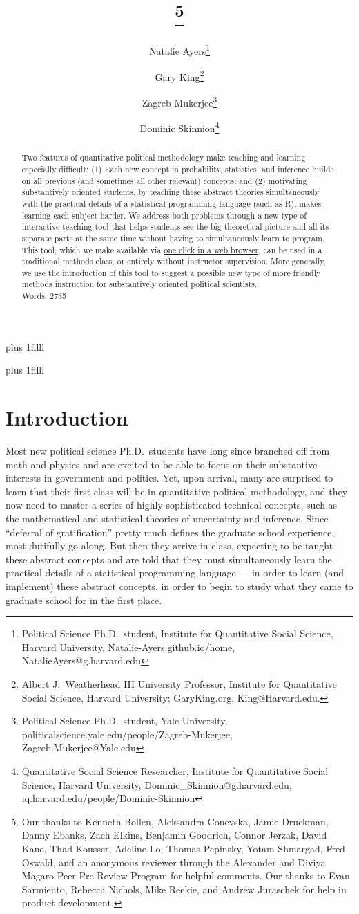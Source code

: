 \documentclass[12pt]{article}
\title{\titl}
\title{\titl\thanks{Our thanks to Kenneth Bollen, Aleksandra Conevska, Jamie Druckman, Danny Ebanks, Zach Elkins, Benjamin Goodrich, Connor Jerzak, David Kane, Thad Kousser, Adeline Lo, Thomas Pepinsky, Yotam Shmargad, Fred Oswald, and an anonymous reviewer through the Alexander and Diviya Magaro Peer Pre-Review Program for helpful comments. Our thanks to Evan Sarmiento, Rebecca Nichols, Mike Reekie, and Andrew Juraschek for help in product development.}}
\author{Natalie Ayers\thanks{Political Science Ph.D.\ student, Institute for Quantitative Social Science, Harvard University, Natalie-Ayers.github.io/home, NatalieAyers@g.harvard.edu}\and Gary King\thanks{Albert J.\ Weatherhead
III University Professor, Institute for Quantitative Social
Science, Harvard University; GaryKing.org, King@Harvard.edu.}\and Zagreb Mukerjee\thanks{Political Science Ph.D.\ student, Yale University, politicalscience.yale.edu/people/Zagreb-Mukerjee, Zagreb.Mukerjee@Yale.edu} \and Dominic Skinnion\thanks{Quantitative Social Science Researcher, Institute for Quantitative Social Science, Harvard University, Dominic\_Skinnion@g.harvard.edu, iq.harvard.edu/people/Dominic-Skinnion}}
\newcommand{\btVFill}{\vskip0pt plus 1filll}
\theoremstyle{definition}
\begin{document}
\maketitle\thispagestyle{empty}\setcounter{page}{0}
\btVFill
\vspace{-2\baselineskip}
\begin{abstract}
  \noindent Two features of quantitative political methodology make teaching and learning especially difficult: (1) Each new concept in probability, statistics, and inference builds on all previous (and sometimes all other relevant) concepts; and (2) motivating substantively oriented students, by teaching these abstract theories simultaneously with the practical details of a statistical programming language (such as R), makes learning each subject harder. We address both problems through a new type of interactive teaching tool that helps students see the big theoretical picture and all its separate parts at the same time without having to simultaneously learn to program. This tool, which we make available via \href{https://2k1.iq.harvard.edu}{one click in a web browser}, can be used in a traditional methods class, or entirely without instructor supervision. More generally, we use the introduction of this tool to suggest a possible new type of more friendly methods instruction for substantively oriented political scientists.
  \\
  \newline
  \noindent Words: 2735
\end{abstract}
\btVFill
\clearpage
{}\baselineskip

\section{Introduction}\label{s:intro}

Most new political science Ph.D.\ students have long since branched off from math and physics and are excited to be able to focus on their substantive interests in government and politics. Yet, upon arrival, many are surprised to learn that their first class will be in quantitative political methodology, and they now need to master a series of highly sophisticated technical concepts, such as the mathematical and statistical theories of uncertainty and inference. Since ``deferral of gratification'' pretty much defines the graduate school experience, most dutifully go along. But then they arrive in class, expecting to be taught these abstract concepts and are told that they must simultaneously learn the practical details of a statistical programming language --- in order to learn (and implement) these abstract concepts, in order to begin to study what they came to graduate school for in the first place.
\end{document}
